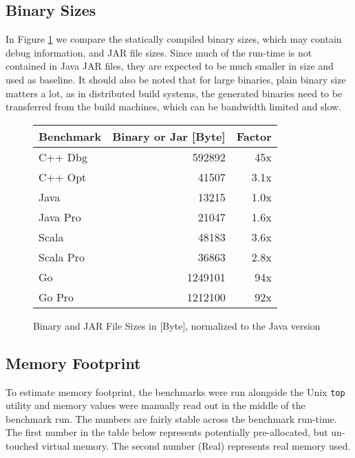 \subsection{Binary Sizes}

In Figure \ref{binsize} we compare the statically compiled binary
sizes, which may contain debug information, and JAR file sizes. Since
much of the run-time is not contained in Java JAR files, they are
expected to be much smaller in size and used as baseline.  It should
also be noted that for large binaries, plain binary size matters a
lot, as in distributed build systems, the generated binaries need to
be transferred from the build machines, which can be bandwidth limited and
slow.

\begin{figure}
\begin{tabular}{|l|r|r|} \hline
 Benchmark   & Binary or Jar [Byte] & Factor \\ \hline\hline
 C++ Dbg     &    592892           &   45x \\ \hline
 C++ Opt     &     41507           &  3.1x \\ \hline
 Java        &     13215           &  1.0x \\ \hline
 Java Pro    &     21047           &  1.6x \\ \hline
 Scala       &     48183           &  3.6x \\ \hline
 Scala Pro   &     36863           &  2.8x \\ \hline
 Go          &   1249101           &   94x \\ \hline
 Go Pro      &   1212100           &   92x \\ \hline
\end{tabular}
\caption{Binary and JAR File Sizes in $[$Byte$]$, normalized to the Java version}
\label{binsize}
\end{figure}


\subsection{Memory Footprint}

To estimate memory footprint, the benchmarks were run alongside
the Unix {\tt top} utility and memory values were manually
read out in the middle of the benchmark run.
The numbers are fairly stable across the benchmark
run-time. The first number in the table below 
represents potentially pre-allocated, but un-touched
virtual memory. The second number (Real) represents real memory used.

